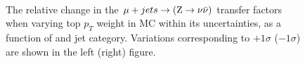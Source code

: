 \begin{figure}[!h]
  \centering
   ~~
  \\

  \caption{\label{fig:tfSyst_topPt_muToZinv} The relative change in
  the $\mu + jets \rightarrow ({\text Z} \rightarrow \nu\bar{\nu})$ transfer
  factors when varying top $p_{T}$ weight in MC within its uncertainties, as a function of \scalht and jet category. 
  Variations corresponding to $+1\sigma$ ($-1\sigma$) are shown in the left (right) figure. 
  }
\end{figure}

